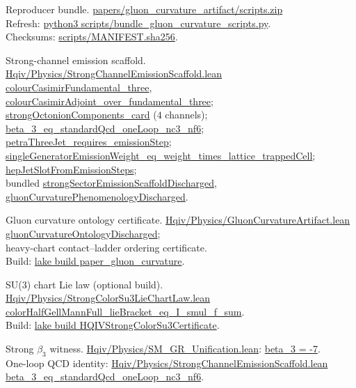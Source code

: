 \documentclass[11pt]{amsart}
\newcommand{\leanrepo}{https://github.com/HQIV/hqiv-lean/blob/main}
\newcommand{\leanfile}[1]{\href{\leanrepo/#1}{\footnotesize\url{#1}}}
\newcommand{\leanid}[1]{{\footnotesize\ttfamily\url{#1}}}
\newenvironment{leanindex}{%
  \begin{description}[style=nextline,leftmargin=0pt,labelindent=0pt,
    labelsep=0.5em,itemsep=0.75\baselineskip]%
  \footnotesize\raggedright\sloppy
}{%
  \end{description}%
}
\begin{document}
\begin{leanindex}
\item[\phantomsection\label{lean:scripts-bundle}Reproducer bundle.]
  \leanid{papers/gluon_curvature_artifact/scripts.zip}\\
  Refresh: \leanid{python3 scripts/bundle_gluon_curvature_scripts.py}.\\
  Checksums: \leanid{scripts/MANIFEST.sha256}.

\item[\phantomsection\label{lean:emission-scaffold}Strong-channel emission scaffold.]
  \leanfile{Hqiv/Physics/StrongChannelEmissionScaffold.lean}\\
  \leanid{colourCasimirFundamental_three},
  \leanid{colourCasimirAdjoint_over_fundamental_three};\\
  \leanid{strongOctonionComponents_card} ($4$ channels);
  \leanid{beta_3_eq_standardQcd_oneLoop_nc3_nf6};\\
  \leanid{petraThreeJet_requires_emissionStep};
  \leanid{singleGeneratorEmissionWeight_eq_weight_times_lattice_trappedCell};\\
  \leanid{hepJetSlotFromEmissionSteps};\\
  bundled \leanid{strongSectorEmissionScaffoldDischarged},
  \leanid{gluonCurvaturePhenomenologyDischarged}.

\item[\phantomsection\label{lean:gluon-closure}Gluon curvature ontology certificate.]
  \leanfile{Hqiv/Physics/GluonCurvatureArtifact.lean}\\
  \leanid{gluonCurvatureOntologyDischarged};\\
  heavy-chart contact--ladder ordering certificate.\\
  Build: \leanid{lake build paper_gluon_curvature}.

\item[\phantomsection\label{lean:su3-chart-law}SU(3) chart Lie law (optional build).]
  \leanfile{Hqiv/Physics/StrongColorSu3LieChartLaw.lean}\\
  \leanid{colorHalfGellMannFull_lieBracket_eq_I_smul_f_sum}.\\
  Build: \leanid{lake build HQIVStrongColorSu3Certificate}.

\item[\phantomsection\label{lean:beta3-witness}Strong $\beta_3$ witness.]
  \leanfile{Hqiv/Physics/SM_GR_Unification.lean}: \leanid{beta_3 = -7}.\\
  One-loop QCD identity: \leanfile{Hqiv/Physics/StrongChannelEmissionScaffold.lean}\\
  \leanid{beta_3_eq_standardQcd_oneLoop_nc3_nf6}.


\end{leanindex}
\end{document}
